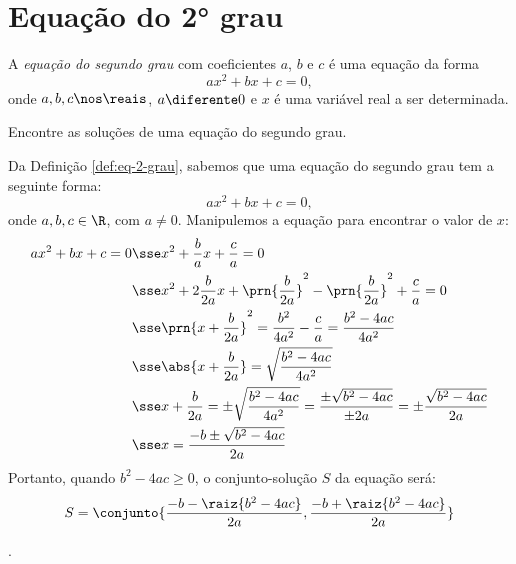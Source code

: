 \section{Equação do 2° grau}

\begin{definition}
	\label{def:eq-2-grau}
	A \emph{equação do segundo grau} com coeficientes $a$, $b$ e $c$ é uma equação da forma 
	\[
		ax^2 + bx + c = 0,
	\]
	onde $a, b, c \nos \reais$, $a \diferente 0$ e $x$ é uma variável real a ser determinada.
\end{definition}

\begin{example}
	\label{ex:sol-2-grau}
	Encontre as soluções de uma equação do segundo grau.
\end{example}

\begin{solution}
	Da Definição \ref{def:eq-2-grau}, sabemos que uma equação do segundo grau tem a seguinte forma:
	\[
		ax^2 + bx + c = 0,
	\]
	onde $a,b,c \in \R$, com $a \ne 0$. Manipulemos a equação para encontrar o valor de $x$:
	\begin{align*}
		ax^2 + bx + c = 0 & \sse x^2+\frac{b}{a}x +\frac{c}{a}=0 \\ 
						  & \sse x^2+2\frac{b}{2a}x+\prn{\frac{b}{2a}}^2-\prn{\frac{b}{2a}}^2+\frac{c}{a}=0\\ 
						  & \sse \prn{x+\frac{b}{2a}}^2=\frac{b^2}{4a^2}-\frac{c}{a}=\frac{b^2 -4ac}{4a^2}\\ 
						  & \sse \abs{x+\frac{b}{2a}} = \sqrt{\frac{b^2-4ac}{4a^2}}\\ 
						  & \sse x+\frac{b}{2a}=\pm\sqrt{\frac{b^2-4ac}{4a^2}}=\frac{\pm\sqrt{b^2-4ac}}{\pm2a}=\pm\frac{\sqrt{b^2-4ac}}{2a}\\ 
						  & \sse x=\frac{-b\pm\sqrt{b^2-4ac}}{2a}\\ 
	\end{align*}
	Portanto, quando $b^2-4ac \ge 0$, o conjunto-solução $S$ da equação será:
	\begin{align*}
		S = \conjunto{\dfrac {-b - \raiz{b^2 - 4ac}} {2a}, \dfrac{-b + \raiz{b^2 - 4ac}} {2a}}
	\end{align*}
\end{solution}

\begin{tve}
\end{tve}

\begin{onlineact}
	.
\end{onlineact}

